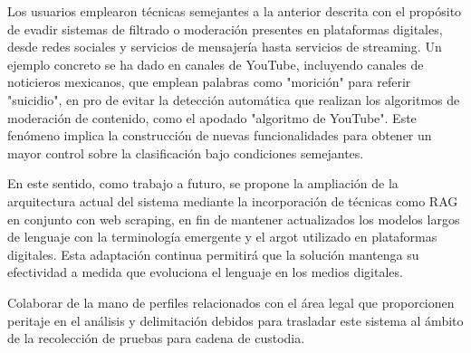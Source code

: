 Los usuarios emplearon técnicas semejantes a la anterior descrita con el propósito de evadir sistemas de filtrado o moderación presentes en plataformas digitales, desde redes sociales y servicios de mensajería hasta servicios de streaming. Un ejemplo concreto se ha dado en canales de YouTube, incluyendo canales de noticieros mexicanos, que emplean palabras como "morición" para referir "suicidio", en pro de evitar la detección automática que realizan los algoritmos de moderación de contenido, como el apodado "algoritmo de YouTube". Este fenómeno implica la construcción de nuevas funcionalidades para obtener un mayor control sobre la clasificación bajo condiciones semejantes.

En este sentido, como trabajo a futuro, se propone la ampliación de la arquitectura actual del sistema mediante la incorporación de técnicas como RAG en conjunto con web scraping, en fin de mantener actualizados los modelos largos de lenguaje con la terminología emergente y el argot utilizado en plataformas digitales. Esta adaptación continua permitirá que la solución mantenga su efectividad a medida que evoluciona el lenguaje en los medios digitales.

Colaborar de la mano de perfiles relacionados con el área legal que proporcionen peritaje en el análisis y delimitación debidos para trasladar este sistema al ámbito de la recolección de pruebas para cadena de custodia.